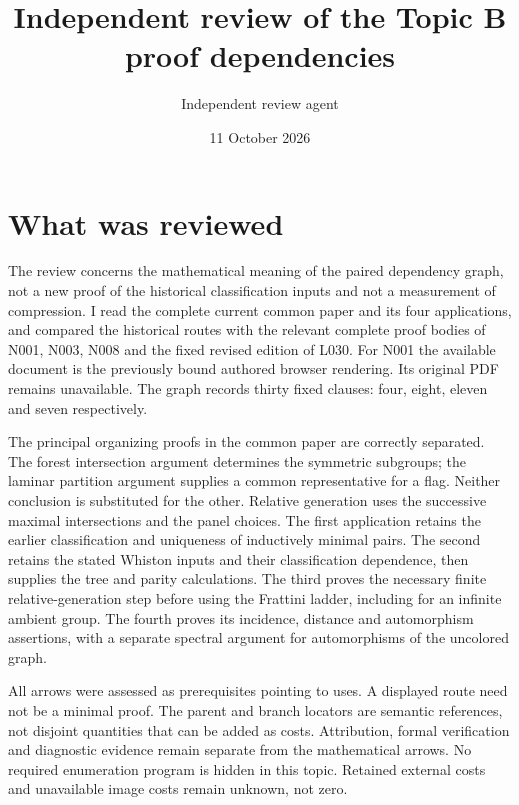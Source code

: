 \documentclass[11pt,a4paper]{article}
\title{Independent review of the Topic B proof dependencies}
\author{Independent review agent}
\date{11 October 2026}
\begin{document}
\maketitle

\section{What was reviewed}
The review concerns the mathematical meaning of the paired dependency graph,
not a new proof of the historical classification inputs and not a measurement
of compression. I read the complete current common paper and its four
applications, and compared the historical routes with the relevant complete
proof bodies of N001, N003, N008 and the fixed revised edition of L030.
For N001 the available document is the previously bound authored browser
rendering. Its original PDF remains unavailable. The graph records thirty
fixed clauses: four, eight, eleven and seven respectively.

The principal organizing proofs in the common paper are correctly separated.
The forest intersection argument determines the symmetric subgroups; the
laminar partition argument supplies a common representative for a flag.
Neither conclusion is substituted for the other. Relative generation uses
the successive maximal intersections and the panel choices. The first
application retains the earlier classification and uniqueness of inductively
minimal pairs. The second retains the stated Whiston inputs and their
classification dependence, then supplies the tree and parity calculations.
The third proves the necessary finite relative-generation step before using
the Frattini ladder, including for an infinite ambient group. The fourth
proves its incidence, distance and automorphism assertions, with a separate
spectral argument for automorphisms of the uncolored graph.

All arrows were assessed as prerequisites pointing to uses. A displayed
route need not be a minimal proof. The parent and branch locators are
semantic references, not disjoint quantities that can be added as costs.
Attribution, formal verification and diagnostic evidence remain separate
from the mathematical arrows. No required enumeration program is hidden
in this topic. Retained external costs and unavailable image costs remain
unknown, not zero.
\end{document}
